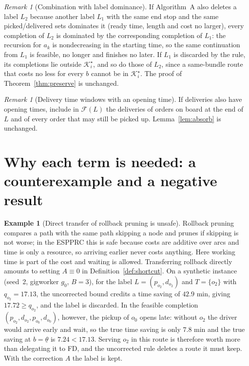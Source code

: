 \documentclass[11pt]{article}
\theoremstyle{definition}
\newtheorem{example}[theorem]{Example}
\theoremstyle{remark}
\newtheorem{remark}[theorem]{Remark}
\newcommand{\Ks}{\mathcal{K}^{\star}}
\newcommand{\thl}{\underline{\theta}}
\newcommand{\0}{\mathbf{0}}
\begin{document}
\begin{remark}[Combination with label dominance]
If Algorithm~A also deletes a label $L_2$ because another label $L_1$ with the same end stop and
the same picked/delivered sets dominates it (ready time, length and cost no larger), every
completion of $L_2$ is dominated by the corresponding completion of $L_1$: the recursion for $a_k$
is nondecreasing in the starting time, so the same continuation from $L_1$ is feasible, no longer
and finishes no later. If $L_1$ is discarded by the rule, its completions lie outside
$\Ks_i$, and so do those of $L_2$, since a same-bundle route that costs no less for every $b$
cannot be in $\Ks_i$. The proof of Theorem~\ref{thm:preserve} is unchanged.
\end{remark}

\begin{remark}[Delivery time windows with an opening time]\label{rem:dlb}
If deliveries also have opening times, include in $\mathcal F(L)$ the deliveries of orders on
board at the end of $L$ and of every order that may still be picked up. Lemma~\ref{lem:absorb}
is unchanged.
\end{remark}

\section{Why each term is needed: a counterexample and a negative result}

\begin{example}[Direct transfer of rollback pruning is unsafe]\label{ex:counter}
Rollback pruning compares a path with the same path skipping a node and prunes if skipping is
not worse; in the ESPPRC this is safe because costs are additive over arcs and time is only a
resource, so arriving earlier never costs anything. Here working time is part of the cost and
waiting is allowed. Transferring rollback directly amounts to setting $A\equiv 0$ in
Definition~\ref{def:shortcut}. On a synthetic instance (seed~2, gigworker $g_0$, $B=3$), for the
label $L=(p_{o_2},d_{o_2})$ and $T=\{o_2\}$ with $q_{o_2}=17.13$, the uncorrected bound credits a
time saving of $42.9$ min, giving $17.72\ge q_{o_2}$, and the label is discarded. In the feasible
completion $(p_{o_2},d_{o_2},p_{o_0},d_{o_0})$, however, the pickup of $o_0$ opens late: without
$o_2$ the driver would arrive early and wait, so the true time saving is only $7.8$ min and the
true saving at $b=\thl$ is $7.24<17.13$. Serving $o_2$ in this route is therefore worth more than
delegating it to FD, and the uncorrected rule deletes a route it must keep. With the correction
$A$ the label is kept.
\end{example}
\end{document}
